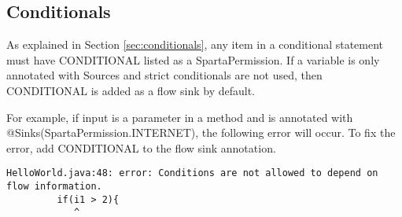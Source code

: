 \subsection{Conditionals}
As explained in Section \ref{sec:conditionals}, any item in a conditional statement must have CONDITIONAL listed as a SpartaPermission.  If a variable is only annotated with Sources and strict conditionals are not used, then CONDITIONAL is added as a flow sink by default. 

For example, if input is a parameter in a method and is annotated with @Sinks(SpartaPermission.INTERNET), the following error will occur.  To fix the error, add CONDITIONAL to the flow sink annotation.  

\begin{Verbatim}
HelloWorld.java:48: error: Conditions are not allowed to depend on flow information.
         if(i1 > 2){
            ^
\end{Verbatim}




